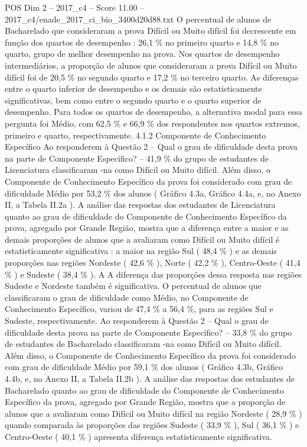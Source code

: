\begin{textsample}{POS Dim 2 – 2017\_c4 – Score 11.00 – 2017\_c4/enade\_2017\_ci\_bio\_3400d20d88.txt}
O percentual de alunos de Bacharelado que consideraram a prova Difícil ou Muito difícil foi decrescente em função dos quartos de desempenho : 26,1 \% no primeiro quarto e 14,8 \% no quarto, grupo de melhor desempenho na prova.
Nos quartos de desempenho intermediários, a proporção de alunos que consideraram a prova Difícil ou Muito difícil foi de 20,5 \% no segundo quarto e 17,2 \% no terceiro quarto.
As diferenças entre o quarto inferior de desempenho e os demais são estatisticamente significativas, bem como entre o segundo quarto e o quarto superior de desempenho.
Para todos os quartos de desempenho, a alternativa modal para essa pergunta foi Médio, com 62,5 \% e 66,9 \% dos respondentes nos quartos extremos, primeiro e quarto, respectivamente. 4.1.2 Componente de Conhecimento Específico Ao responderem à Questão 2 – Qual o grau de dificuldade desta prova na parte de Componente Específico? – 41,9 \% do grupo de estudantes de Licenciatura classificaram -na como Difícil ou Muito difícil.
Além disso, o Componente de Conhecimento Específico da prova foi considerado com grau de dificuldade Médio por 53,2 \% dos alunos ( Gráfico 4.3a, Gráfico 4.4a, e, no Anexo II, a Tabela II.2a ).
A análise das respostas dos estudantes de Licenciatura quanto ao grau de dificuldade do Componente de Conhecimento Específico da prova, agregado por Grande Região, mostra que a diferença entre a maior e as demais proporções de alunos que a avaliaram como Difícil ou Muito difícil é estatisticamente significativa : a maior na região Sul ( 48,4 \% ) e as demais proporções nas regiões Nordeste ( 42,6 \% ), Norte ( 42,2 \% ), Centro-Oeste ( 41,4 \% ) e Sudeste ( 38,4 \% ).
A A diferença das proporções dessa resposta nas regiões Sudeste e Nordeste também é significativa.
O percentual de alunos que classificaram o grau de dificuldade como Médio, no Componente de Conhecimento Específico, variou de 47,4 \% a 56,4 \%, para as regiões Sul e Sudeste, respectivamente.
Ao responderem à Questão 2 – Qual o grau de dificuldade desta prova na parte de Componente Específico? – 33,8 \% do grupo de estudantes de Bacharelado classificaram -na como Difícil ou Muito difícil.
Além disso, o Componente de Conhecimento Específico da prova foi considerado com grau de dificuldade Médio por 59,1 \% dos alunos ( Gráfico 4.3b, Gráfico 4.4b, e, no Anexo II, a Tabela II.2b ).
A análise das respostas dos estudantes de Bacharelado quanto ao grau de dificuldade do Componente de Conhecimento Específico da prova, agregado por Grande Região, mostra que a proporção de alunos que a avaliaram como Difícil ou Muito difícil na região Nordeste ( 28,9 \% ) quando comparada às proporções das regiões Sudeste ( 33,9 \% ), Sul ( 36,1 \% ) e Centro-Oeste ( 40,1 \% ) apresenta diferença estatisticamente significativa.

\end{textsample}
